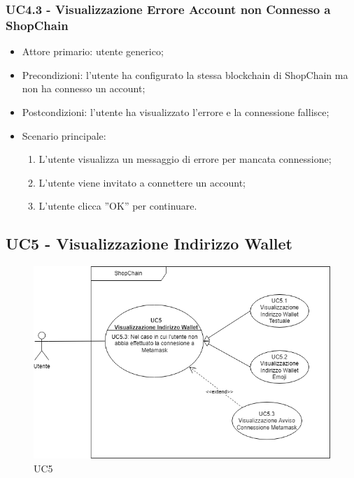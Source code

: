 \subsubsection{UC4.3 - Visualizzazione Errore Account non Connesso a ShopChain}

\begin{itemize}
    \item Attore primario: utente generico;
    \item Precondizioni: l'utente ha configurato la stessa blockchain\glo{} di ShopChain ma non ha connesso un account;
    \item Postcondizioni: l'utente ha visualizzato l'errore e la connessione fallisce;
    \item Scenario principale:
          \begin{enumerate}
              \item L'utente visualizza un messaggio di errore per mancata connessione;
              \item L'utente viene invitato a connettere un account;
              \item L'utente clicca ”OK” per continuare.
          \end{enumerate}
\end{itemize}

\subsection{UC5 - Visualizzazione Indirizzo Wallet}

\begin{figure}[H]
    \centering
    \includegraphics[scale=0.7]{immagini/UC5.png}
    \caption{UC5}
\end{figure}

